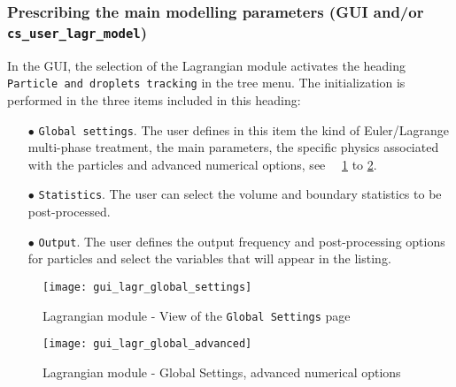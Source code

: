 {{{%
\subsubsection{Prescribing the main modelling parameters (GUI and/or \texttt{cs\_user\_lagr\_model})}\label{sec:Ini-lag}


In the GUI, the selection of the Lagrangian module activates the heading \texttt{Particle and droplets tracking} in the tree menu. The initialization is performed in the three items included in this heading:
%
\begin{itemize}
 \item [$\bullet$] \texttt{Global settings}. The user defines in this item the kind of Euler/Lagrange multi-phase treatment, the main parameters, the specific physics associated with the particles and advanced numerical options, see ~\figurename~\ref {fig:Ini-Lag1} to \figurename\ref {fig:Ini-Lag3}.
 \item [$\bullet$] \texttt{Statistics}. The user can select the volume and boundary statistics to be post-processed.
 \item [$\bullet$] \texttt{Output}. The user defines the output frequency and post-processing options for particles and select the variables that will appear in the listing.
\end{itemize}

\begin{figure}[ht]
\begin{center}
\texttt{[image: gui\_lagr\_global\_settings]}
\caption{Lagrangian module - View of the \texttt{Global Settings} page}
\label{fig:Ini-Lag1}
\end{center}
\end{figure}
%
%
 \begin{figure}[ht]
 \begin{center}
 \texttt{[image: gui\_lagr\_global\_advanced]}
 \caption{Lagrangian module - Global Settings, advanced numerical options}
 \label{fig:Ini-Lag3}
 \end{center}
 \end{figure}
%
%

}}}
